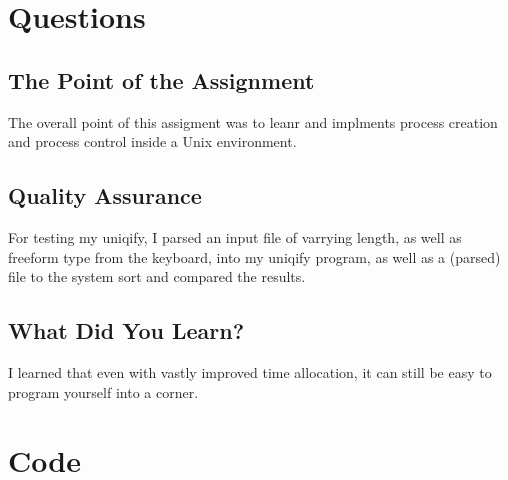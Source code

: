 \documentclass[letterpaper,10pt,titlepage]{article}
\begin{document}
\section{Questions}
\label{Project Quesions}
\subsection{The Point of the Assignment}
\label{Point}
The overall point of this assigment was to leanr and implments process creation and process control inside a Unix environment.
\subsection{Quality Assurance}
\label{QA}
For testing my uniqify, I parsed an input file of varrying length, as well as freeform type from the keyboard, into my uniqify program, as well as a (parsed) file to the system sort and compared the results.
\subsection{What Did You Learn?}
\label{Learned}
I learned that even with vastly improved time allocation, it can still be easy to program yourself into a corner.



\section{Code}
\label{myar Source Code}

\end{document}
